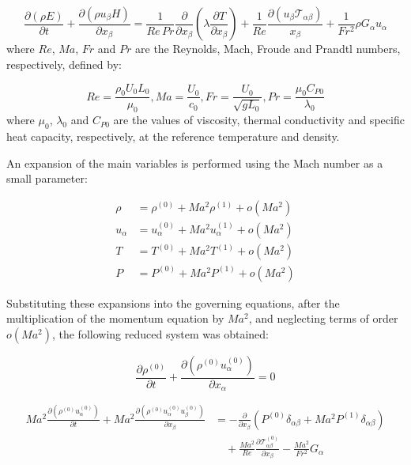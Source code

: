 \begin{equation}
    \frac{\partial (\rho E)}{\partial t} + \frac{\partial (\rho u_\beta H)}{\partial x_\beta} = \frac{1}{Re\, Pr} \frac{\partial }{\partial x_\beta} (\lambda \frac{\partial T}{\partial x_\beta}) + \frac{1}{Re} \frac{\partial (u_\beta \mathcal{T}_{\alpha\beta})}{x_\beta} + \frac{1}{Fr^2} \rho G_\alpha u_\alpha
\end{equation}
where $Re$, $M\!a$, $Fr$ and $Pr$ are the Reynolds, Mach, Froude and Prandtl
numbers, respectively, defined by: 

\begin{equation*}
   Re = \frac{\rho_0 U_0 L_0}{\mu_0} , M\!a = \frac{U_0}{c_0} , Fr = \frac{U_0}{\sqrt{g L_0}} , Pr = \frac{\mu_0 C_{P0}}{\lambda_0} 
\end{equation*}
where $\mu_0$, $\lambda_0$ and $C_{P0}$ are the values of viscosity, thermal
conductivity and specific heat capacity, respectively, at the reference
temperature and density.

An expansion of the main variables is performed using the Mach number as a small
parameter:

\begin{align}
    \rho &= \rho^{(0)} + M\!a^2 \rho^{(1)} +o(M\!a^2) \\
    u_{\alpha} &= u_{\alpha}^{(0)} + M\!a^2 u_{\alpha}^{(1)} + o(M\!a^2) \\
    T &= T^{(0)} + M\!a^2 T^{(1)} + o(M\!a^2) \\
    P &= P^{(0)} + M\!a^2 P^{(1)} + o(M\!a^2)
\end{align}

 Substituting these expansions into the governing equations, after the
 multiplication of the momentum equation by $M\!a^2$, and neglecting terms of
 order $o(M\!a^2)$, the following reduced system was obtained:

\begin{equation}
    \frac{\partial \rho^{(0)}}{\partial t} + \frac{\partial (\rho^{(0)} u^{(0)}_\alpha)}{\partial x_\alpha} = 0
\end{equation}

\begin{align}
    M\!a^2 \frac{\partial (\rho^{(0)} u^{(0)}_\alpha)}{\partial t} 
    + M\!a^2 \frac{\partial (\rho^{(0)} u^{(0)}_\alpha u^{(0)}_\beta)}{\partial x_\beta}
    &= - \frac{\partial}{\partial x_\beta} 
        \left(P^{(0)}\delta_{\alpha\beta} + M\!a^2 P^{(1)}\delta_{\alpha\beta}\right) \nonumber \\
    &\quad + \frac{M\!a^2}{Re} \frac{\partial \mathcal{T}_{\alpha\beta}^{(0)}}{\partial x_\beta}
    - \frac{M\!a^2}{Fr^2}G_\alpha
\end{align}


